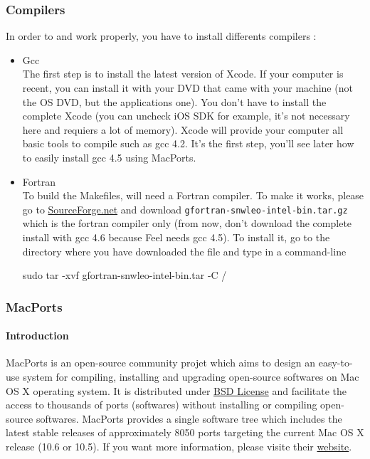 \subsubsection{Compilers}

In order to \feel and \cmake work properly, you have to install differents compilers :
\begin{itemize}
\item Gcc \\
The first step is to install the latest version of Xcode. If your computer is recent, you can install it with your DVD that came with your machine (not the OS DVD, but the applications one). You don't have to install the complete Xcode (you can uncheck iOS SDK for example, it's not necessary here and requiers a lot of memory). Xcode will provide your computer all basic tools to compile such as gcc 4.2. It's the first step, you'll see later how to easily install gcc 4.5 using MacPorts.
\item Fortran \\
To build the Makefiles, \cmake will need a Fortran compiler. To make it works, please go to \href{http://hpc.sourceforge.net/}{SourceForge.net} and download \lstinline|gfortran-snwleo-intel-bin.tar.gz| which is the fortran compiler only (from now, don't download the complete install with gcc 4.6 because Feel needs gcc 4.5). To install it, go to the directory where you have downloaded the file and type in a command-line
\begin{unixcom}
		sudo tar -xvf gfortran-snwleo-intel-bin.tar -C /
\end{unixcom}

\end{itemize}

\subsubsection{MacPorts}

\paragraph{Introduction}
MacPorts is an open-source community projet which aims to design an easy-to-use system for compiling, installing and upgrading open-source softwares on Mac OS X operating system. It is distributed under \href{http://opensource.org/licenses/bsd-license.php}{BSD License} and facilitate the access to thousands of ports (softwares) without installing or compiling open-source softwares.
MacPorts provides a single software tree which includes the latest stable releases of approximately 8050 ports targeting the current Mac OS X release (10.6 or 10.5). If you want more information, please visite their \href{http://www.macports.org/}{website}.

